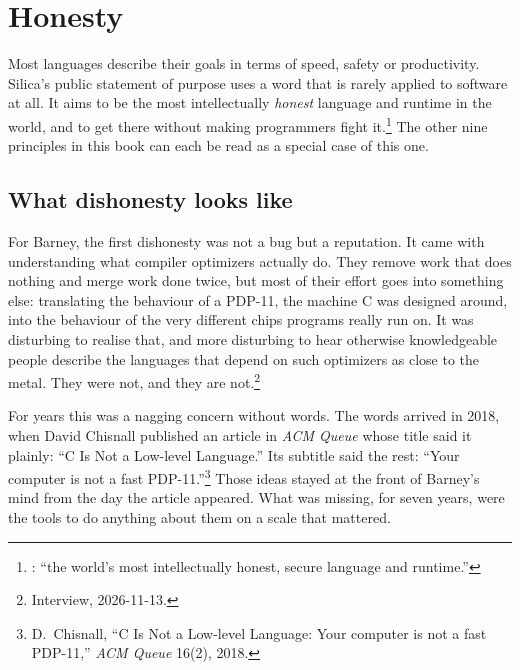 \chapter{Honesty}
\label{ch:hidden}

Most languages describe their goals in terms of speed, safety or
productivity. Silica's public statement of purpose uses a word that is rarely
applied to software at all. It aims to be the most intellectually
\emph{honest} language and runtime in the world, and to get there without
making programmers fight it.\footnote{: ``the world's
most intellectually honest, secure language and runtime.''} The other nine
principles in this book can each be read as a special case of this one.

\section{What dishonesty looks like}

For Barney, the first dishonesty was not a bug but a reputation. It came with
understanding what compiler optimizers actually do. They remove work that does
nothing and merge work done twice, but most of their effort goes into something
else: translating the behaviour of a PDP-11, the machine C was designed around,
into the behaviour of the very different chips programs really run on. It was
disturbing to realise that, and more disturbing to hear otherwise
knowledgeable people describe the languages that depend on such optimizers as
close to the metal. They were not, and they are not.\footnote{Interview,
2026-11-13.}

For years this was a nagging concern without words. The words arrived in 2018,
when David Chisnall published an article in \emph{ACM Queue} whose title said it
plainly: ``C Is Not a Low-level Language.'' Its subtitle said the rest: ``Your
computer is not a fast PDP-11.''\footnote{D.~Chisnall, ``C Is Not a Low-level
Language: Your computer is not a fast PDP-11,'' \emph{ACM Queue} 16(2), 2018.}
Those ideas stayed at the front of Barney's mind from the day the article
appeared. What was missing, for seven years, were the tools to do anything about
them on a scale that mattered.

